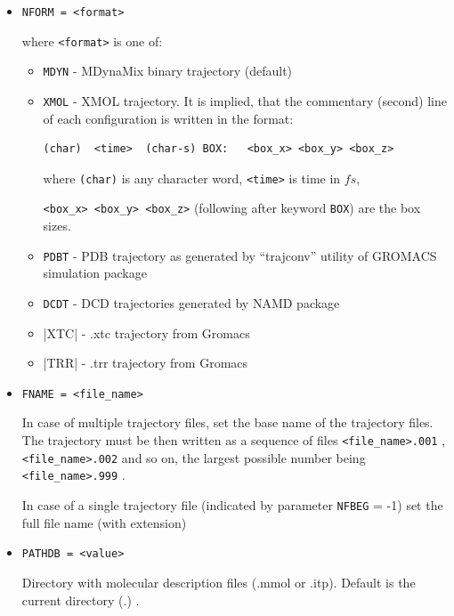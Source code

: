 \documentclass{article}
\begin{document}
\begin{itemize}

\item
\verb|NFORM = <format>|

where \verb|<format>| is one of: 

\begin{itemize}

\item
\verb|MDYN| - MDynaMix binary trajectory (default)

\item
\verb|XMOL| - XMOL trajectory. It is implied, that the commentary 
(second) line of each configuration is written in the format:

\begin{verbatim}
(char)  <time>  (char-s) BOX:   <box_x> <box_y> <box_z>
\end{verbatim}

where \verb|(char)| is any character word, \verb|<time>| is time in $fs$,

\verb|<box_x> <box_y> <box_z>| (following after keyword \verb|BOX|) are
the box sizes. 
  
\item
\verb|PDBT| - PDB trajectory as generated by ``trajconv'' utility
of GROMACS simulation package

\item
\verb|DCDT| - DCD trajectories generated by NAMD package

\item|XTC| - .xtc trajectory from Gromacs 
  
\item|TRR| - .trr trajectory from Gromacs

\end{itemize}

\item
\verb|FNAME = <file_name>|

In case of multiple trajectory files, set the base name of the trajectory
files. The trajectory must be then written as a sequence of files
\verb|<file_name>.001| , \verb|<file_name>.002| and 
so on, the largest possible number being \verb|<file_name>.999| . 

In case of a single trajectory file (indicated by parameter \verb|NFBEG| = -1)
set the full file name (with extension) 

\item
\verb|PATHDB = <value>|

Directory with molecular description files (.mmol or .itp). Default is the 
current directory (.) .


\end{itemize}
\end{document}
